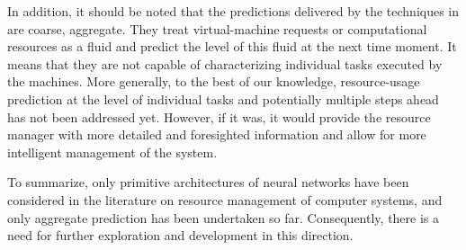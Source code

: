 In addition, it should be noted that the predictions delivered by the techniques
in \cite{cao2014, dabbagh2015, ismaeel2015} are coarse, aggregate. They treat
virtual-machine requests or computational resources as a fluid and predict the
level of this fluid at the next time moment. It means that they are not capable
of characterizing individual tasks executed by the machines. More generally, to
the best of our knowledge, resource-usage prediction at the level of individual
tasks and potentially multiple steps ahead has not been addressed yet. However,
if it was, it would provide the resource manager with more detailed and
foresighted information and allow for more intelligent management of the system.

To summarize, only primitive architectures of neural networks have been
considered in the literature on resource management of computer systems, and
only aggregate prediction has been undertaken so far. Consequently, there is a
need for further exploration and development in this direction.
